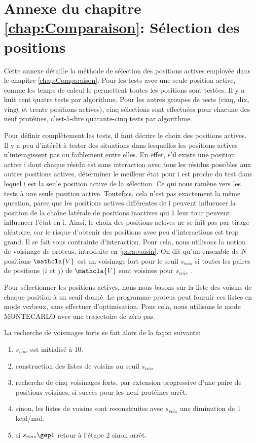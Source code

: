 \chapter*{Annexe du chapitre \ref{chap:Comparaison}: Sélection des positions }
\label{chap:annexeposi}
Cette annexe détaille la méthode de sélection des positions actives employée dans le chapitre \ref{chap:Comparaison}.
Pour les tests avec une seule position active, comme les temps de calcul le permettent toutes les positions sont testées. Il y a huit cent quatre tests par algorithme. Pour les autres groupes de tests (cinq, dix, vingt et trente positions actives), cinq sélections sont effectuées pour chacune  des neuf protéines, c'est-à-dire quarante-cinq tests par algorithme.

Pour définir complètement les tests, il faut décrire le choix des positions actives.
Il y a peu d'intérêt à tester des situations dans lesquelles les positions actives n'interagissent pas ou faiblement entre elles.
En effet, s'il existe une position active i dont chaque résidu est sans interaction avec tous les résidus possibles aux autres positions actives, déterminer le meilleur état pour i est proche du test dans lequel i est la seule position active de la sélection. Ce qui nous ramène vers les tests à une seule position active. Toutefois, cela n'est pas exactement la même question, parce que les positions actives différentes de i peuvent influencer la position de la chaîne latérale de positions inactives qui à leur tour peuvent influencer l'état en i. Ainsi, le choix des positions actives ne se fait pas par tirage aléatoire, car le risque d'obtenir des positions avec peu d'interactions est trop grand. Il se fait sous contrainte d'interaction. Pour cela, nous utilisons la notion de voisinage de proteus, introduite en \ref{para:voisin}. On dit qu'un ensemble de $N$ positions $\mathcla{V}$ est un \og voisinage fort \fg  pour le seuil $s_{vois}$ si toutes les paires de positions $(i$ et $j)$ de $\mathcla{V}$ sont voisines pour $s_{vois}$ .

Pour sélectionner les positions actives, nous nous basons sur la liste des voisins de chaque position à un seuil donné. Le programme proteus peut fournir ces listes en mode verbeux, sans effectuer d'optimisation. Pour cela, nous utilisons le mode MONTECARLO avec une trajectoire de zéro pas. 

La recherche de voisinages forts se fait alors de la façon suivante:

\begin{enumerate}
\item $s_{vois}$ est initialisé à $10$.
\item construction des listes de voisins au seuil $s_{vois}$  
\item recherche de cinq voisinages forts, par extension progressive d'une paire de positions voisines, si succès pour les neuf protéines arrêt.
\item sinon, les listes de voisins sont reconstruites avec $s_{vois}$  une diminution de 1 kcal/mol. 
\item si $ s_{vois} \gep 1 $ retour à l'étape 2 sinon arrêt.  
\end{enumerate}

